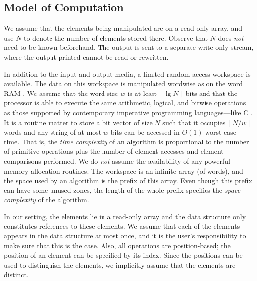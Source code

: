 \documentclass[final,onetabnum,onefignum,onethmnum]{siamltex}
\newcommand{\ceils}[1]{\left\lceil #1 \right\rceil}
\begin{document}
\subsection{Model of Computation} 
We assume that the elements being manipulated are on a read-only array, 
and use $N$ to denote the number of elements stored there.  
Observe that $N$ does \emph{not} need to be known beforehand.  
The output is sent to a separate write-only stream, 
where the output printed cannot be read or rewritten. 

In addition to the input and output media, a limited
random-access workspace is available.  The data on this workspace is
manipulated wordwise as on the word RAM \cite{Hag98}. We assume that
the word size $w$ is at least $\ceils{\lg N}$ bits and that the
processor is able to execute the same arithmetic, logical, and bitwise
operations as those supported by contemporary imperative programming
languages---like C \cite{KR88}.  It is a routine matter \cite[Section
  7.1.3]{Knu11} to store a bit vector of size $N$ such that it
occupies $\ceils{N/w}$ words and any string of at most $w$ bits can be
accessed in $O(1)$ worst-case time.  That is, the \emph{time
  complexity} of an algorithm is proportional to the number of
primitive operations plus the number of element accesses and element
comparisons performed.
We do \emph{not} assume the availability of any powerful memory-allocation
routines. The workspace is an infinite array (of words), 
and the space used by an algorithm is the prefix of this array. 
Even though this prefix can have some unused zones, the length of
the whole prefix specifies the \emph{space complexity} of the algorithm. 

In our setting, the elements lie in a read-only array and the data
structure only constitutes references to these elements. We assume
that each of the elements appears in the data structure at most once,
and it is the user's responsibility to make sure that this is the
case. Also, all operations are position-based; the position of an
element can be specified by its index.  Since the
positions can be used to distinguish the elements, we implicitly
assume that the elements are distinct.
\end{document}
